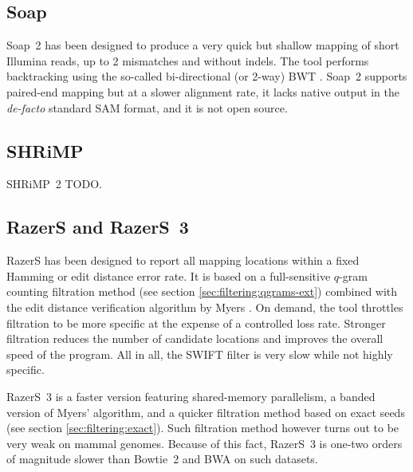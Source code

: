 
\subsection{Soap}
\label{background:mappers:soap}

Soap~2 \citep{Li2009b} has been designed to produce a very quick but shallow mapping of short Illumina reads, up to 2 mismatches and without indels.
The tool performs backtracking using the so-called bi-directional (or 2-way) BWT \citep{Belazzougui2013}.
Soap~2 supports paired-end mapping but at a slower alignment rate, it lacks native output in the \emph{de-facto} standard SAM format, and it is not open source.


\subsection{SHRiMP}
\label{background:mappers:shrimp}

SHRiMP~2 TODO.


\subsection{RazerS and RazerS~3}
\label{background:mappers:razers}

RazerS \citep{Weese2009} has been designed to report all mapping locations within a fixed Hamming or edit distance error rate.
It is based on a full-sensitive $q$-gram counting filtration method (see section \ref{sec:filtering:qgrams-ext}) combined with the edit distance verification algorithm by Myers \citep{Myers1999}.
On demand, the tool throttles filtration to be more specific at the expense of a controlled loss rate.
Stronger filtration reduces the number of candidate locations and improves the overall speed of the program.
All in all, the SWIFT filter is very slow while not highly specific.

RazerS~3 \citep{Weese2012} is a faster version featuring shared-memory parallelism, a banded version of Myers' algorithm, and a quicker filtration method based on exact seeds (see section \ref{sec:filtering:exact}).
Such filtration method however turns out to be very weak on mammal genomes.
Because of this fact, RazerS~3 is one-two orders of magnitude slower than Bowtie~2 and BWA on such datasets.

